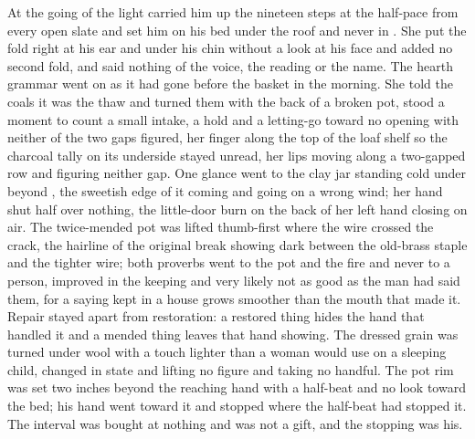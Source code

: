 At the going of the light  carried him up the nineteen steps at the half-pace from every open slate and set him on his bed under the roof and never in . She put the fold right at his ear and under his chin without a look at his face and added no second fold, and said nothing of the voice, the reading or the name. The hearth grammar went on as it had gone before the basket in the morning. She told the coals it was the thaw and turned them with the back of a broken pot, stood a moment to count a small intake, a hold and a letting-go toward no opening with neither of the two gaps figured, her finger along the top of the loaf shelf so the charcoal tally on its underside stayed unread, her lips moving along a two-gapped row and figuring neither gap. One glance went to the clay jar standing cold under  beyond , the sweetish edge of it coming and going on a wrong wind; her hand shut half over nothing, the little-door burn on the back of her left hand closing on air. The twice-mended pot was lifted thumb-first where the wire crossed the crack, the hairline of the original break showing dark between the old-brass staple and the tighter wire; both proverbs went to the pot and the fire and never to a person, improved in the keeping and very likely not as good as the man had said them, for a saying kept in a house grows smoother than the mouth that made it. Repair stayed apart from restoration: a restored thing hides the hand that handled it and a mended thing leaves that hand showing. The dressed grain was turned under wool with a touch lighter than a woman would use on a sleeping child, changed in state and lifting no figure and taking no handful. The pot rim was set two inches beyond the reaching hand with a half-beat and no look toward the bed; his hand went toward it and stopped where the half-beat had stopped it. The interval was bought at nothing and was not a gift, and the stopping was his.

